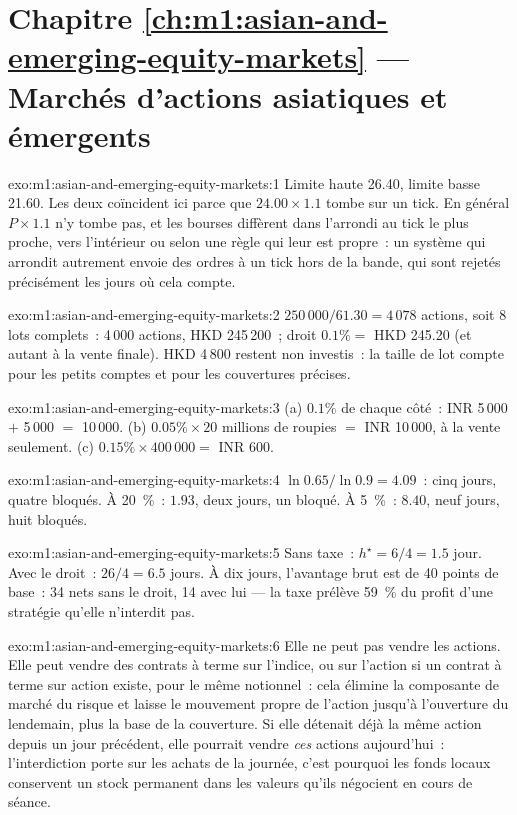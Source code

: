 \section*{Chapitre \ref{ch:m1:asian-and-emerging-equity-markets} --- Marchés d'actions asiatiques et émergents}

\begin{solution}{exo:m1:asian-and-emerging-equity-markets:1}
Limite haute 26.40, limite basse 21.60. Les deux coïncident ici parce que
$24.00\times1.1$ tombe sur un tick. En général $P\times1.1$ n'y tombe pas,
et les bourses diffèrent dans l'arrondi au tick le plus proche, vers
l'intérieur ou selon une règle qui leur est propre~: un système qui arrondit
autrement envoie des ordres à un tick hors de la bande, qui sont rejetés précisément les jours où cela compte.
\end{solution}

\begin{solution}{exo:m1:asian-and-emerging-equity-markets:2}
$250\,000/61.30 = 4\,078$ actions, soit 8 lots complets~: 4\,000 actions, HKD
245\,200~; droit $0.1\% = $ HKD 245.20 (et autant à la vente finale). HKD
4\,800 restent non investis~: la taille de lot compte pour les petits comptes et
pour les couvertures précises.
\end{solution}

\begin{solution}{exo:m1:asian-and-emerging-equity-markets:3}
(a) $0.1\%$ de chaque côté~: INR 5\,000 $+$ 5\,000 $=$ 10\,000. (b) $0.05\%
\times 20$ millions de roupies $=$ INR 10\,000, à la vente seulement. (c) $0.15\% \times
400\,000 =$ INR 600.
\end{solution}

\begin{solution}{exo:m1:asian-and-emerging-equity-markets:4}
$\ln0.65/\ln0.9 = 4.09$~: cinq jours, quatre bloqués. À 20~\%~: $1.93$,
deux jours, un bloqué. À 5~\%~: $8.40$, neuf jours, huit bloqués.
\end{solution}

\begin{solution}{exo:m1:asian-and-emerging-equity-markets:5}
Sans taxe~: $h^\star = 6/4 = 1.5$ jour. Avec le droit~: $26/4 = 6.5$ jours. À dix
jours, l'avantage brut est de 40 points de base~: 34 nets sans le droit, 14 avec lui
--- la taxe prélève 59~\% du profit d'une stratégie qu'elle n'interdit pas.
\end{solution}

\begin{solution}{exo:m1:asian-and-emerging-equity-markets:6}
Elle ne peut pas vendre les actions. Elle peut vendre des contrats à terme sur
l'indice, ou sur l'action si un contrat à terme sur action existe, pour le même notionnel~: cela élimine
la composante de marché du risque et laisse le mouvement propre de l'action jusqu'à
l'ouverture du lendemain, plus la base de la couverture. Si elle détenait déjà la même
action depuis un jour précédent, elle pourrait vendre \emph{ces} actions aujourd'hui~: l'interdiction
porte sur les achats de la journée, c'est pourquoi les fonds locaux conservent un stock permanent
dans les valeurs qu'ils négocient en cours de séance.
\end{solution}


